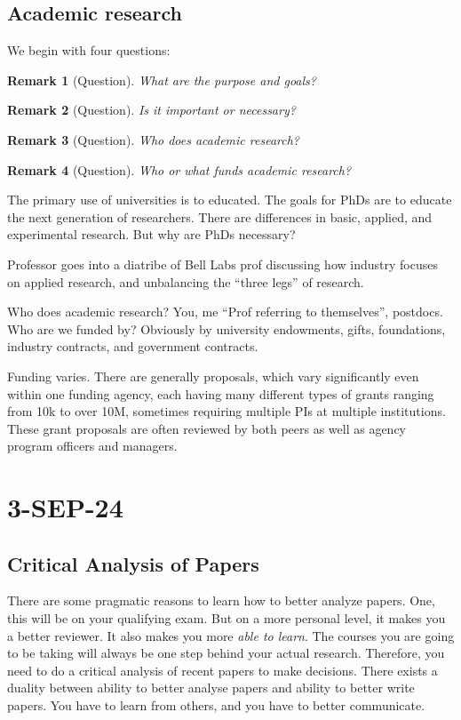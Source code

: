 \documentclass[10pt, oneside]{article}
\newtheorem{rem}{Remark}
\begin{document}
\subsection{Academic research}
We begin with four questions:
\begin{rem}[Question]
    What are the purpose and goals?
\end{rem}
\begin{rem}[Question]
    Is it important or necessary?
\end{rem}
\begin{rem}[Question]
Who does academic research?
\end{rem}
\begin{rem}[Question]
    Who or what funds academic research?
\end{rem}
The primary use of universities is to educated. The goals for PhDs are to educate the next generation of researchers. There are differences in basic, applied, and experimental research. But why are PhDs necessary? 

Professor goes into a diatribe of Bell Labs prof discussing how industry focuses on applied research, and unbalancing the ``three legs'' of research. 

Who does academic research? You, me ``Prof referring to themselves'', postdocs. Who are we funded by? Obviously by university endowments, gifts, foundations, industry contracts, and government contracts. 

Funding varies. There are generally proposals, which vary significantly even within one funding agency, each having many different types of grants ranging from 10k to over 10M, sometimes requiring multiple PIs at multiple institutions. These grant proposals are often reviewed by both peers as well as agency program officers and managers. 

\section{3-SEP-24}
\subsection{Critical Analysis of Papers}

There are some pragmatic reasons to learn how to better analyze papers. One, this will be on your qualifying exam. But on a more personal level, it makes you a better reviewer. It also makes you more \textit{able to learn}. The courses you are going to be taking will always be one step behind your actual research. Therefore, you need to do a critical analysis of recent papers to make decisions. There exists a duality between ability to better analyse papers and ability to better write papers. You have to learn from others, and you have to better communicate. 
\end{document}
